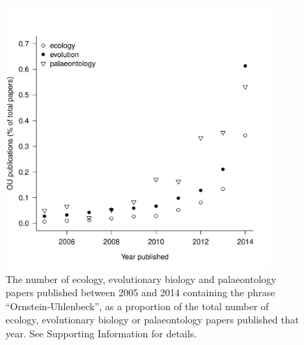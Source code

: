 \documentclass[a4paper,12pt]{article}
\begin{document}
    \begin{figure}[!htbp]
      \centering
      \includegraphics[width=10cm, height=10cm, keepaspectratio=true]{Figures/OhYou_Figure1.pdf}
      \caption{The number of ecology, evolutionary biology and palaeontology papers published between 2005 and 2014 containing the phrase ``Ornstein-Uhlenbeck'', as a proportion of the total number of ecology, evolutionary biology or palaeontology papers published that year. See Supporting Information for details.
      }
      \label{figure.literature}
\end{figure}
\end{document}
